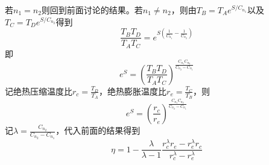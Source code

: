 \documentclass[CJK]{beamer}
\begin{document}
\begin{frame}
\bch
{\scriptsize 
若$n_1=n_2$则回到前面讨论的结果。若$n_1\ne n_2$，则由$T_B = T_A e^{S/C_{n_1}}$以及$T_C = T_D e^{S/C_{n_2}}$得到
$$\frac{T_B T_D}{T_AT_C} = e^{S\left(\frac{1}{C_{n_1}} - \frac{1}{C_{n_2}}\right)}$$
即
$$ e^S = \left(\frac{T_B T_D}{T_AT_C}\right)^{\frac{C_{n_1}C_{n_2}}{C_{n_2}-C_{n_1}}}$$
记绝热压缩温度比$r_c = \frac{T_D}{T_A}$，绝热膨胀温度比$r_e = \frac{T_C}{T_B}$，则
$$ e^S = \left(\frac{r_c}{r_e}\right)^{\frac{C_{n_1}C_{n_2}}{C_{n_2}-C_{n_1}}}$$
记{\blue $\lambda = \frac{C_{n_2}}{C_{n_2}-C_{n_1}}$}，代入前面的结果得到
{\blue $$\eta =1- \frac{\lambda}{\lambda-1} \frac{r_c^\lambda r_e - r_e^\lambda r_c}{r_c^\lambda - r_e^\lambda}$$}
}
\ech
\end{frame}
\end{document}
